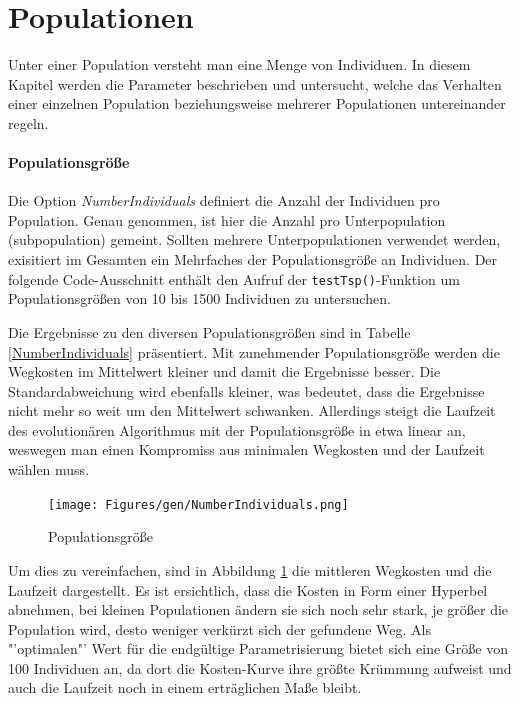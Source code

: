 \section{Populationen}\label{populations}


Unter einer Population versteht man eine Menge von Individuen. In diesem Kapitel
werden die Parameter beschrieben und untersucht, welche das Verhalten einer
einzelnen Population beziehungsweise mehrerer Populationen untereinander regeln.

\paragraph{Populationsgröße} Die Option \emph{NumberIndividuals} definiert die Anzahl der Individuen
pro Population. Genau genommen, ist hier die Anzahl pro Unterpopulation
(subpopulation) gemeint. Sollten mehrere Unterpopulationen verwendet werden,
exisitiert im Gesamten ein Mehrfaches der Populationsgröße an Individuen.
Der folgende Code-Ausschnitt enthält den Aufruf der {\tt testTsp()}-Funktion um
Populationsgrößen von 10 bis 1500 Individuen zu untersuchen.





\noindent Die Ergebnisse zu den diversen Populationsgrößen sind in Tabelle
\ref{NumberIndividuals} präsentiert. Mit zunehmender Populationsgröße werden die
Wegkosten im Mittelwert kleiner und damit die Ergebnisse besser.
Die Standardabweichung wird ebenfalls kleiner, was bedeutet, dass die Ergebnisse
nicht mehr so weit um den Mittelwert schwanken. Allerdings steigt die Laufzeit
des evolutionären Algorithmus mit der Populationsgröße in etwa linear an,
weswegen man einen Kompromiss aus minimalen Wegkosten und der Laufzeit wählen
muss.

\begin{figure}[h!]
  \centering
  \texttt{[image: Figures/gen/NumberIndividuals.png]}
  \caption{Populationsgröße}\label{fig.numberindividuals}
\end{figure}

Um dies zu vereinfachen, sind in Abbildung \ref{fig.numberindividuals} die
mittleren Wegkosten und die Laufzeit dargestellt. Es ist ersichtlich, dass die
Kosten in Form einer Hyperbel abnehmen, bei kleinen Populationen ändern sie sich
noch sehr stark, je größer die Population wird, desto weniger verkürzt sich der
gefundene Weg. Als "'optimalen"' Wert für die endgültige Parametrisierung bietet
sich eine Größe von 100 Individuen an, da dort die Kosten-Kurve ihre größte
Krümmung aufweist und auch die Laufzeit noch in einem erträglichen Maße bleibt.


